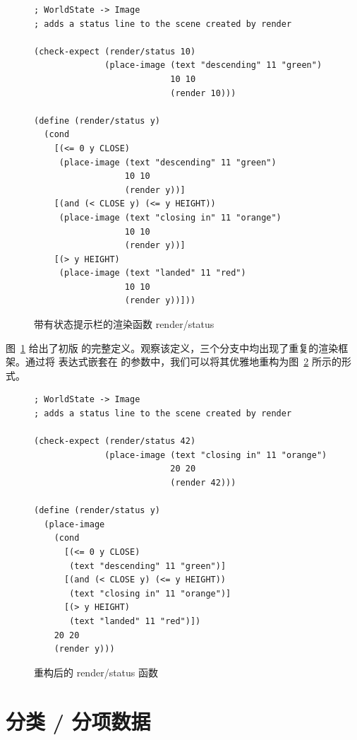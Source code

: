 \begin{figure}[htbp]
  \centering
\begin{lstlisting}[language=BSL, basicstyle=\scriptsize\ttfamily]
; WorldState -> Image
; adds a status line to the scene created by render

(check-expect (render/status 10)
              (place-image (text "descending" 11 "green")
                           10 10
                           (render 10)))

(define (render/status y)
  (cond
    [(<= 0 y CLOSE)
     (place-image (text "descending" 11 "green")
                  10 10
                  (render y))]
    [(and (< CLOSE y) (<= y HEIGHT))
     (place-image (text "closing in" 11 "orange")
                  10 10
                  (render y))]
    [(> y HEIGHT)
     (place-image (text "landed" 11 "red")
                  10 10
                  (render y))]))
\end{lstlisting}
  \caption{带有状态提示栏的渲染函数 render/status}
  \label{fig:render_status_orig}
\end{figure}

图~\ref{fig:render_status_orig} 给出了初版  的完整定义。观察该定义，三个分支中均出现了重复的渲染框架。通过将  表达式嵌套在  的参数中，我们可以将其优雅地重构为图~\ref{fig:render_status_revised} 所示的形式。

\begin{figure}[htbp]
  \centering
\begin{lstlisting}[language=BSL, basicstyle=\scriptsize\ttfamily]
; WorldState -> Image
; adds a status line to the scene created by render

(check-expect (render/status 42)
              (place-image (text "closing in" 11 "orange")
                           20 20
                           (render 42)))

(define (render/status y)
  (place-image
    (cond
      [(<= 0 y CLOSE)
       (text "descending" 11 "green")]
      [(and (< CLOSE y) (<= y HEIGHT))
       (text "closing in" 11 "orange")]
      [(> y HEIGHT)
       (text "landed" 11 "red")])
    20 20
    (render y)))
\end{lstlisting}
  \caption{重构后的 render/status 函数}
  \label{fig:render_status_revised}
\end{figure}

\section{分类 / 分项数据}
\label{sec:4.5_itemizations}

